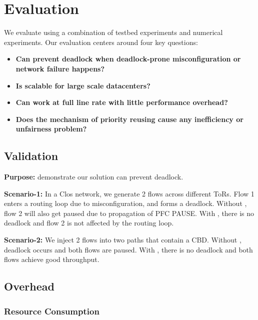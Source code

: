 \section{Evaluation}\label{sec:eval}

We evaluate \sysname{} using a combination of testbed experiments and numerical experiments. Our evaluation centers around four key questions:

\begin{itemize}
	\item \textbf{Can \sysname{} prevent deadlock when deadlock-prone misconfiguration or network failure happens?}
	
	\item \textbf{Is \sysname{} scalable for large scale datacenters?}
	
	\item \textbf{Can \sysname{} work at full line rate with little performance overhead?}
	
	\item \textbf{Does the mechanism of priority reusing cause any inefficiency or unfairness problem?} 
	
\end{itemize}

\subsection{Validation}\label{subsec:exp_validation}

\textbf{Purpose:} demonstrate our solution can prevent deadlock.

\textbf{Scenario-1:} In a Clos network, we generate 2 flows across different ToRs. Flow 1 enters a routing loop due to misconfiguration, and forms a deadlock. Without \sysname{}, flow 2 will also get paused due to propagation of PFC PAUSE. With \sysname{}, there is no deadlock and flow 2 is not affected by the routing loop.

\textbf{Scenario-2:} We inject 2 flows into two paths that contain a CBD. Without \sysname{}, deadlock occurs and both flows are paused. With \sysname{}, there is no deadlock and both flows achieve good throughput.

\subsection{Overhead}\label{subsec:exp_overhead}

\subsubsection{Resource Consumption}\label{subsec:exp_resourceconsump}

